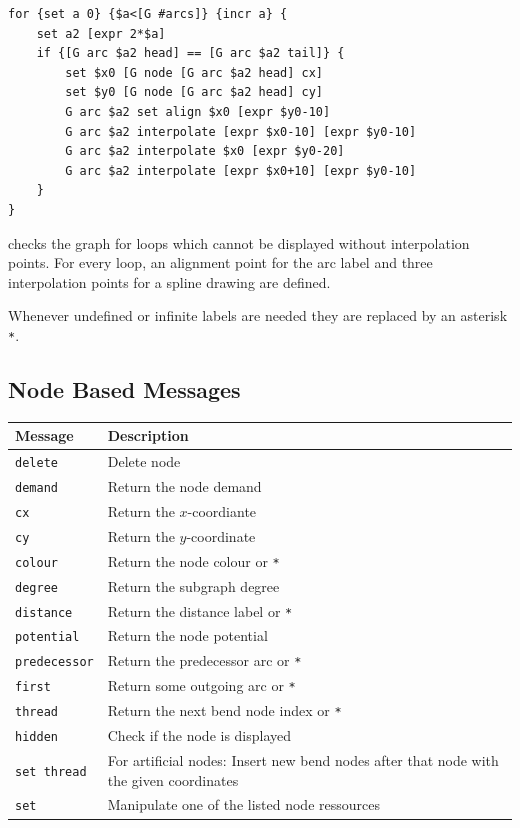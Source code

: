 \documentclass[a4paper,11pt,twoside]{book}
\begin{document}
\begin{mysample}
\begin{verbatim}
for {set a 0} {$a<[G #arcs]} {incr a} {
    set a2 [expr 2*$a]
    if {[G arc $a2 head] == [G arc $a2 tail]} {
        set $x0 [G node [G arc $a2 head] cx]
        set $y0 [G node [G arc $a2 head] cy]
        G arc $a2 set align $x0 [expr $y0-10]
        G arc $a2 interpolate [expr $x0-10] [expr $y0-10]
        G arc $a2 interpolate $x0 [expr $y0-20]
        G arc $a2 interpolate [expr $x0+10] [expr $y0-10]
    }
}
\end{verbatim}
\end{mysample}
checks the graph for loops which cannot be displayed without interpolation
points. For every loop, an alignment point for the arc label and three
interpolation points for a spline drawing are defined.

Whenever undefined or infinite labels are needed they are replaced by an
asterisk \verb/*/.

\subsection{Node Based Messages}
\label{slb_node_messages}
\medskip
\begin{center}
\begin{tabular}{|p{3cm}|p{21.5cm}|}
\hline
{\bf Message}       & {\bf Description} \\
\hline
\hline
\verb/delete/       & Delete node \\
\hline
\verb/demand/       & Return the node demand \\
\hline
\verb/cx/           & Return the $x$-coordiante \\
\hline
\verb/cy/           & Return the $y$-coordinate \\
\hline
\verb/colour/       & Return the node colour or \verb/*/ \\
\hline
\verb/degree/       & Return the subgraph degree \\
\hline
\verb/distance/     & Return the distance label or \verb/*/ \\
\hline
\verb/potential/    & Return the node potential \\
\hline
\verb/predecessor/  & Return the predecessor arc or \verb/*/ \\
\hline
\verb/first/        & Return some outgoing arc or \verb/*/ \\
\hline
\verb/thread/       & Return the next bend node index or \verb/*/ \\
\hline
\verb/hidden/       & Check if the node is displayed \\
\hline
\verb/set thread/   & For artificial nodes: Insert new bend nodes
                      after that node with the given coordinates \\
\hline
\verb/set/          & Manipulate one of the listed node ressources \\
\hline
\end{tabular}
\end{center}
\bigskip
\end{document}
